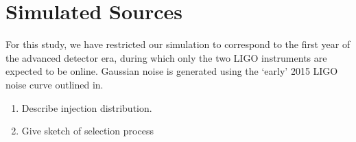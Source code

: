 \section{Simulated Sources}

For this study, we have restricted our simulation to correspond to the first year of the advanced detector era, during which only the two LIGO instruments are expected to be online.  Gaussian noise is generated using the `early' 2015 LIGO noise curve outlined in\cite{Barsotti:2012}.
\begin{enumerate}
\item Describe injection distribution.
\item Give sketch of selection process
\end{enumerate}